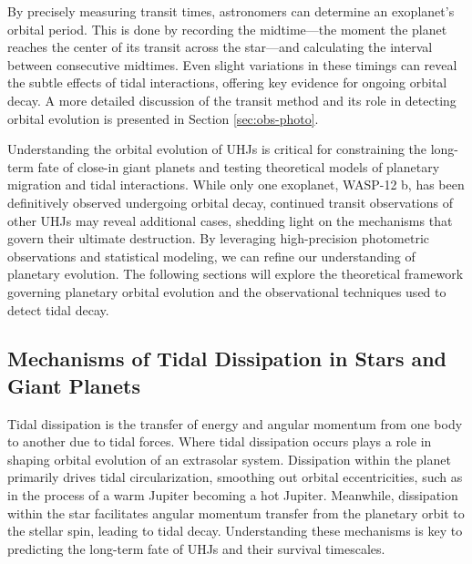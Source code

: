 \documentclass[oneside,12pt]{amsart}
\numberwithin{page}{section}
\begin{document}
By precisely measuring transit times, astronomers can determine an exoplanet’s orbital period. This is done by recording the midtime—the moment the planet reaches the center of its transit across the star—and calculating the interval between consecutive midtimes. Even slight variations in these timings can reveal the subtle effects of tidal interactions, offering key evidence for ongoing orbital decay. A more detailed discussion of the transit method and its role in detecting orbital evolution is presented in Section \ref{sec:obs-photo}.

Understanding the orbital evolution of UHJs is critical for constraining the long-term fate of close-in giant planets and testing theoretical models of planetary migration and tidal interactions. While only one exoplanet, WASP-12 b, has been definitively observed undergoing orbital decay, continued transit observations of other UHJs may reveal additional cases, shedding light on the mechanisms that govern their ultimate destruction. By leveraging high-precision photometric observations and statistical modeling, we can refine our understanding of planetary evolution. The following sections will explore the theoretical framework governing planetary orbital evolution and the observational techniques used to detect tidal decay.




\subsection{Mechanisms of Tidal Dissipation in Stars and Giant Planets}\label{sec:tidaldissipation}

Tidal dissipation is the transfer of energy and angular momentum from one body to another due to tidal forces. Where tidal dissipation occurs plays a role in shaping orbital evolution of an extrasolar system. Dissipation within the planet primarily drives tidal circularization, smoothing out orbital eccentricities, such as in the process of a warm Jupiter becoming a hot Jupiter. Meanwhile, dissipation within the star facilitates angular momentum transfer from the planetary orbit to the stellar spin, leading to tidal decay. Understanding these mechanisms is key to predicting the long-term fate of UHJs and their survival timescales.
\end{document}
